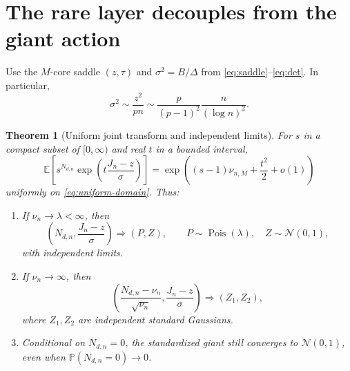 \documentclass[11pt,a4paper]{article}
\numberwithin{equation}{section}
\newtheorem{theorem}{Theorem}[section]
\theoremstyle{definition}
\theoremstyle{remark}
\newcommand{\E}{\mathbb E}\newcommand{\Prob}{\mathbb P}
\newcommand{\Normal}{\mathcal N}\newcommand{\Pois}{\operatorname{Pois}}
\begin{document}
\section{The rare layer decouples from the giant action}
\label{sec:joint}
Use the $M$-core saddle $(z,\tau)$ and $\sigma^2=B/\Delta$ from
\eqref{eq:saddle}--\eqref{eq:det}. In particular,
\begin{equation}
 \sigma^2\sim\frac{z^2}{pn}
 \sim\frac{p}{(p-1)^2}\frac{n}{(\log n)^2}.
 \label{eq:sigma}
\end{equation}

\begin{theorem}[Uniform joint transform and independent limits]
\label{thm:joint}
For $s$ in a compact subset of $[0,\infty)$ and real $t$ in a bounded
interval,
\begin{equation}
 \E\left[s^{N_{d,n}}
    \exp\left(t\frac{J_n-z}{\sigma}\right)\right]
 =\exp\left((s-1)\nu_{n,M}+\frac{t^2}{2}+o(1)\right)
 \label{eq:joint}
\end{equation}
uniformly on \eqref{eq:uniform-domain}. Thus:
\begin{enumerate}[label=(\roman*)]
\item If $\nu_n\to\lambda<\infty$, then
\[
 \left(N_{d,n},\frac{J_n-z}{\sigma}\right)
 \Longrightarrow(P,Z),
 \qquad P\sim\Pois(\lambda),\quad Z\sim\Normal(0,1),
\]
with independent limits.
\item If $\nu_n\to\infty$, then
\[
 \left(\frac{N_{d,n}-\nu_n}{\sqrt{\nu_n}},
       \frac{J_n-z}{\sigma}\right)
 \Longrightarrow(Z_1,Z_2),
\]
where $Z_1,Z_2$ are independent standard Gaussians.
\item Conditional on $N_{d,n}=0$, the standardized giant still converges
to $\Normal(0,1)$, even when $\Prob(N_{d,n}=0)\to0$.
\end{enumerate}
\end{theorem}
\end{document}
